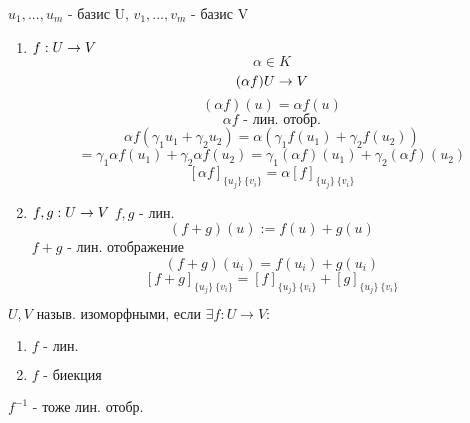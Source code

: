 \documentclass[algebra]{subfiles}
\begin{document}
    \begin{consequence}
        $u_1,...,u_m$ - базис U, $v_1,...,v_m$ - базис V
        \begin{enumerate}
          \item $f: U \rightarrow V$
          \[\alpha \in K\]
          \[(\alpha f) U \rightarrow V\]
          \[(\alpha f)(u) = \alpha f(u)\]
          \[\alpha f \text{ - лин. отобр.}\]
          \[\alpha f(\gamma_1 u_1 + \gamma_2 u_2) = \alpha (\gamma_1 f(u_1) + \gamma_2 f(u_2))\]
          \[= \gamma_1 \alpha f(u_1) + \gamma_2 \alpha f(u_2) = \gamma_1 (\alpha f) (u_1) + \gamma_2 (\alpha f) (u_2)\]
          \[[\alpha f]_{\{u_j\}\ \{v_i\}} = \alpha[f]_{\{u_j\}\ \{v_i\}}\]
          \item $f,g: U \rightarrow V$ $f,g$ - лин.
          \[(f+g)(u) := f(u) + g(u)\]
          $f+g$ - лин. отображение
          \[(f+g)(u_i) = f(u_i) + g(u_i)\]
          \[[f + g]_{\{u_j\}\ \{v_i\}} = [f]_{\{u_j\}\ \{v_i\}} + [g]_{\{u_j\}\ \{v_i\}}\]
        \end{enumerate}
    \end{consequence}

    \begin{definition}
        $U,V \text{ назыв. изоморфными, если } \exists f: U \to V:$
        \begin{enumerate}
            \item $f \text{ - лин.}$
            \item $f \text{ - биекция}$
        \end{enumerate}
    \end{definition}

    \begin{upr}
        $f^{-1}$ - тоже лин. отобр.
    \end{upr}
\end{document}

